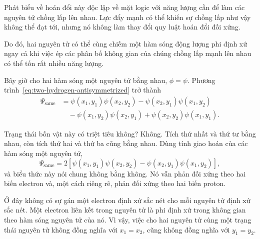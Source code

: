 Phát biểu về hoán đổi này độc lập về mặt logic với năng lượng cần để làm các nguyên tử chồng lấp lên nhau. Lực đẩy mạnh có thể khiến sự chồng lấp như vậy không thể đạt tới, nhưng nó không làm thay đổi quy luật hoán đổi đối xứng.

\begin{classroomqa}
\end{classroomqa}

Do đó, hai nguyên tử có thể cùng chiếm một hàm sóng động lượng phi định xứ ngay cả khi việc ép các phân bố không gian của chúng chồng lấp mạnh lên nhau có thể tốn rất nhiều năng lượng.

Bây giờ cho hai hàm sóng một nguyên tử bằng nhau, \(\phi=\psi\). Phương trình~\eqref{eq:two-hydrogen-antisymmetrized} trở thành
\begin{align}
\Psi_{\mathrm{same}}
&=\psi(x_1,y_1)\psi(x_2,y_2)
-\psi(x_2,y_1)\psi(x_1,y_2)\nonumber\\
&\quad
-\psi(x_1,y_2)\psi(x_2,y_1)
+\psi(x_2,y_2)\psi(x_1,y_1).
\end{align}

Trạng thái bốn vật này có triệt tiêu không? Không. Tích thứ nhất và thứ tư bằng nhau, còn tích thứ hai và thứ ba cũng bằng nhau. Dùng tính giao hoán của các hàm sóng một nguyên tử,
\begin{equation}
\Psi_{\mathrm{same}}
=
2\left[
\psi(x_1,y_1)\psi(x_2,y_2)
-\psi(x_2,y_1)\psi(x_1,y_2)
\right],
\label{eq:same-hydrogen-state}
\end{equation}
và biểu thức này nói chung không bằng không. Nó vẫn phản đối xứng theo hai biến electron và, một cách riêng rẽ, phản đối xứng theo hai biến proton.

Ở đây không có sự gán một electron định xứ sắc nét cho mỗi nguyên tử định xứ sắc nét. Một electron liên kết trong nguyên tử là phi định xứ trong không gian theo hàm sóng nguyên tử của nó. Vì vậy, việc cho hai nguyên tử cùng một trạng thái nguyên tử không đồng nghĩa với \(x_1=x_2\), cũng không đồng nghĩa với \(y_1=y_2\).

